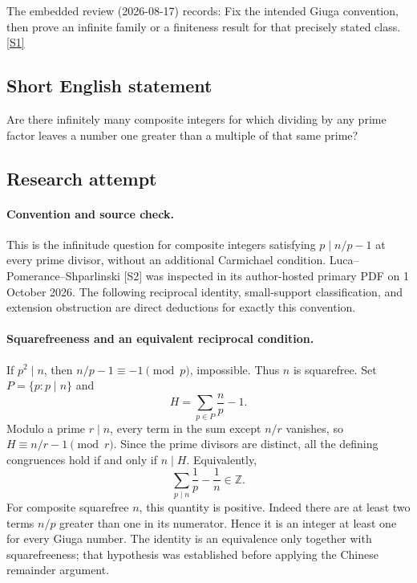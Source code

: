 \documentclass[11pt,a4paper]{article}
\newcommand{\sref}[2]{\hyperlink{source:#1:#2}{[S#2]}}
\begin{document}
The embedded review (2026-08-17) records: Fix the intended Giuga convention, then prove an infinite family or a finiteness result for that precisely stated class. \sref{1255}{1}

\subsection{Short English statement}

Are there infinitely many composite integers for which dividing by any prime factor leaves a number one greater than a multiple of that same prime?

\subsection{Research attempt}

\paragraph{Convention and source check.}
This is the infinitude question for composite integers satisfying
$p\mid n/p-1$ at every prime divisor, without an additional
Carmichael condition. Luca--Pomerance--Shparlinski [S2] was inspected
in its author-hosted primary PDF on 1 October 2026. The following
reciprocal identity, small-support classification, and extension
obstruction are direct deductions for exactly this convention.

\paragraph{Squarefreeness and an equivalent reciprocal condition.}
If $p^2\mid n$, then $n/p-1\equiv-1\pmod p$, impossible. Thus
$n$ is squarefree. Set $P=\{p:p\mid n\}$ and
\[
 H=\sum_{p\in P}\frac np-1.
\]
Modulo a prime $r\mid n$, every term in the sum except $n/r$ vanishes,
so $H\equiv n/r-1\pmod r$. Since the prime divisors are distinct,
all the defining congruences hold if and only if $n\mid H$.
Equivalently,
\[
                   \sum_{p\mid n}\frac1p-\frac1n\in\mathbb Z.
\]
For composite squarefree $n$, this quantity is positive. Indeed there
are at least two terms $n/p$ greater than one in its numerator.
Hence it is an integer at least one for every Giuga number.
The identity is an equivalence only together with squarefreeness;
that hypothesis was established before applying the Chinese remainder
argument.
\end{document}
